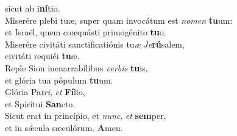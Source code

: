 \oddverse sicut ab i\textbf{ní}tio.\\
\evenverse Miserére plebi tuæ, super quam invocátum est \textit{no}\textit{men} \textbf{tu}um:~\*\\
\evenverse et Israël, quem coæquásti primogénito \textbf{tu}o.\\
\oddverse Miserére civitáti sanctificatiónis tu\textit{æ} \textit{Je}\textbf{rú}salem,~\*\\
\oddverse civitáti requiéi \textbf{tu}æ.\\
\evenverse Reple Sion inenarrabílibus \textit{ver}\textit{bis} \textbf{tu}is,~\*\\
\evenverse et glória tua pópulum \textbf{tu}um.\\
\oddverse Glória Pa\textit{tri}, \textit{et} \textbf{Fí}lio,~\*\\
\oddverse et Spirítui \textbf{San}cto.\\
\evenverse Sicut erat in princípio, et \textit{nunc}, \textit{et} \textbf{sem}per,~\*\\
\evenverse et in sǽcula sæculórum. \textbf{A}men.\\
